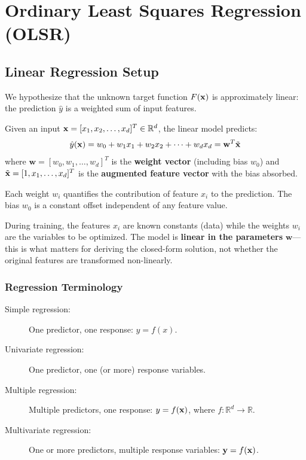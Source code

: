 \chapter*{Ordinary Least Squares Regression (OLSR)}

\section*{Linear Regression Setup}

We hypothesize that the unknown target function $F(\mathbf{x})$ is approximately linear: the prediction $\hat{y}$ is a weighted sum of input features.

\begin{definition}
Given an input $\mathbf{x} = [x_1, x_2, \dots, x_d]^T \in \mathbb{R}^d$, the linear model predicts:
$$\hat{y}(\mathbf{x}) = w_0 + w_1 x_1 + w_2 x_2 + \dots + w_d x_d = \mathbf{w}^T \tilde{\mathbf{x}}$$
where $\mathbf{w} = [w_0, w_1, \dots, w_d]^T$ is the \textbf{weight vector} (including bias $w_0$) and $\tilde{\mathbf{x}} = [1, x_1, \dots, x_d]^T$ is the \textbf{augmented feature vector} with the bias absorbed.
\end{definition}

Each weight $w_i$ quantifies the contribution of feature $x_i$ to the prediction. The bias $w_0$ is a constant offset independent of any feature value.

\begin{remark}
During training, the features $x_i$ are known constants (data) while the weights $w_i$ are the variables to be optimized. The model is \textbf{linear in the parameters} $\mathbf{w}$---this is what matters for deriving the closed-form solution, not whether the original features are transformed non-linearly.
\end{remark}

\subsection*{Regression Terminology}

\begin{description}
    \item[Simple regression:] One predictor, one response: $y = f(x)$.
    \item[Univariate regression:] One predictor, one (or more) response variables.
    \item[Multiple regression:] Multiple predictors, one response: $y = f(\mathbf{x})$, where $f: \mathbb{R}^d \to \mathbb{R}$.
    \item[Multivariate regression:] One or more predictors, multiple response variables: $\mathbf{y} = f(\mathbf{x})$.
\end{description}

